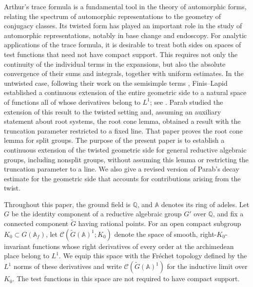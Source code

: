 \documentclass[12pt]{amsart}
\theoremstyle{definition}
\theoremstyle{plain}
\theoremstyle{remark}
\def\Q{\mathbb{Q}}%
\def\A{\mathbb{A}}%
\newcommand{\cC}{\mathcal{C}}
\numberwithin{equation}{section}
\newcommand{\tG}{\widetilde{G}}
\begin{document}
Arthur's trace formula is a fundamental tool in the theory of automorphic forms, relating the spectrum of automorphic
representations to the geometry of conjugacy classes.
Its twisted form has played an important role in the study of automorphic representations, notably in base change and endoscopy.
For analytic applications of the trace formula, it is desirable to treat both sides on spaces of test functions that need not have compact support.
This requires not only the continuity of the individual terms in the expansions, but also the absolute convergence of their sums and integrals, together with uniform estimates.
In the untwisted case, following their work on the semisimple terms \cite{FL11semi}, Finis--Lapid established a continuous extension of the entire geometric side to a natural space of functions all of whose derivatives belong to $L^1$; see \cite{FL16}.
Parab \cite{Par19} studied the extension of this result to the twisted setting and, assuming an auxiliary statement about root systems, the root cone lemma, obtained a result with the truncation parameter restricted to a fixed line.
That paper proves the root cone lemma for split groups.
The purpose of the present paper is to establish a continuous extension of the twisted geometric side for general reductive algebraic groups, including nonsplit groups, without assuming this lemma or restricting the truncation parameter to a line.
We also give a revised version of Parab's decay estimate for the geometric side that accounts for contributions arising
from the twist.


Throughout this paper, the ground field is $\Q$, and $\A$ denotes its ring of adeles.
Let $G$ be the identity component of a reductive algebraic group $G'$ over $\Q$, and fix a connected component $\tG$ having rational points.
For an open compact subgroup $K_0\subset G(\A_f)$, let $\cC(\tG(\A)^1;K_0)$ denote the space of smooth,
right-$K_0$-invariant functions whose right derivatives of every order at the archimedean place belong to $L^1$.
We equip this space with the Fr\'echet topology defined by the $L^1$ norms of these derivatives and write
$\cC(\tG(\A)^1)$ for the inductive limit over $K_0$. 
The test functions in this space are not required to have compact support.
\end{document}
